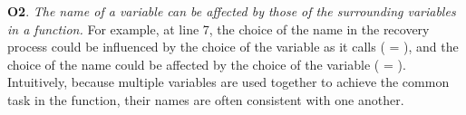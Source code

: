 







\textbf{O2}. {\em The name of a variable can be affected by those of
  the surrounding variables in a function.} For example, at line 7,
the choice of the name  in the recovery process could be
influenced by the choice of the variable  as it calls
 ( = ), and
the choice of the name  could be affected by
the choice of the variable  ( =
).
%
Intuitively, because multiple variables are used together to achieve
the common task in the function, their names are often consistent with
one another.



